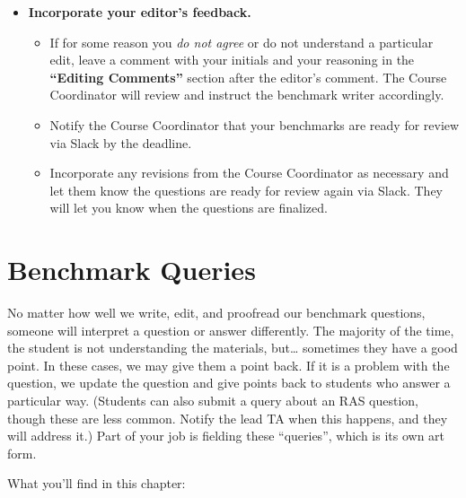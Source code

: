 \documentclass[
]{article}
\providecommand{\tightlist}{%
  \setlength{\itemsep}{0pt}\setlength{\parskip}{0pt}}
\begin{document}
\begin{itemize}
\tightlist
\item
  \textbf{Incorporate your editor's feedback.}

  \begin{itemize}
  \tightlist
  \item
    If for some reason you \emph{do not agree} or do not understand a particular edit, leave a comment with your initials and your reasoning in the \textbf{``Editing Comments''} section after the editor's comment. The Course Coordinator will review and instruct the benchmark writer accordingly.\\
  \item
    Notify the Course Coordinator that your benchmarks are ready for review via Slack by the deadline.\\
  \item
    Incorporate any revisions from the Course Coordinator as necessary and let them know the questions are ready for review again via Slack. They will let you know when the questions are finalized.
  \end{itemize}
\end{itemize}

\hypertarget{benchmark-queries}{%
\section{Benchmark Queries}\label{benchmark-queries}}

No matter how well we write, edit, and proofread our benchmark questions, someone will interpret a question or answer differently. The majority of the time, the student is not understanding the materials, but\ldots{} sometimes they have a good point. In these cases, we may give them a point back. If it is a problem with the question, we update the question and give points back to students who answer a particular way. (Students can also submit a query about an RAS question, though these are less common. Notify the lead TA when this happens, and they will address it.) Part of your job is fielding these ``queries'', which is its own art form.

What you'll find in this chapter:
\end{document}
